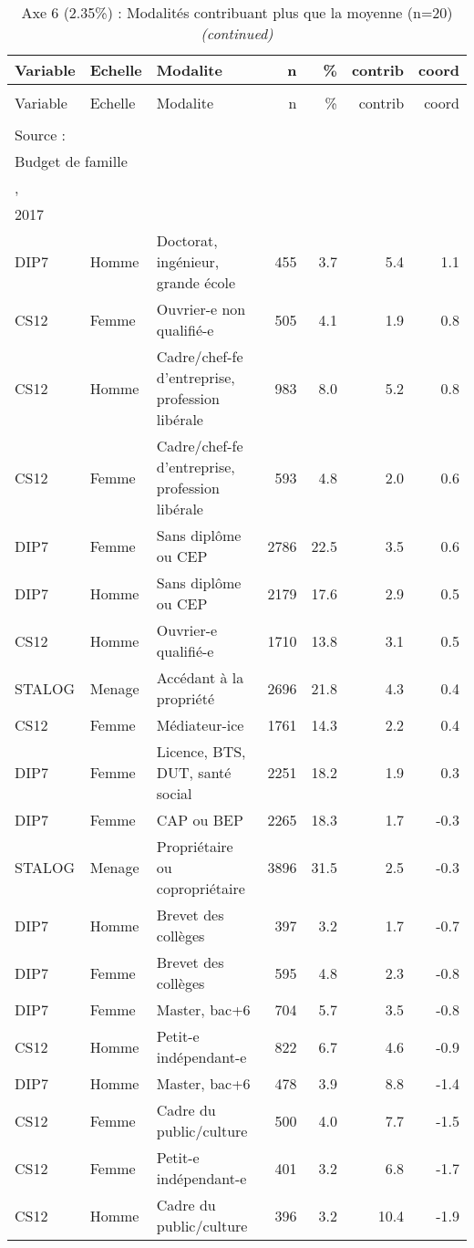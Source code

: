 \documentclass[
  12pt,
]{book}
\begin{document}
\begin{longtable}[t]{lllrrrr}
\caption{Axe 6 (2.35\%) : Modalités contribuant plus que la moyenne  (n=20)}\\
\toprule
Variable & Echelle & Modalite & n & \% & contrib & coord\\
\midrule
\endfirsthead
\caption[]{Axe 6 (2.35\%) : Modalités contribuant plus que la moyenne  (n=20) \textit{(continued)}}\\
\toprule
Variable & Echelle & Modalite & n & \% & contrib & coord\\
\midrule
\endhead

\endfoot
\bottomrule
\multicolumn{7}{l}{\rule{0pt}{1em}\textit{Note: }}\\
\multicolumn{7}{l}{\rule{0pt}{1em}Source :}\\
\multicolumn{7}{l}{\rule{0pt}{1em}Budget de famille}\\
\multicolumn{7}{l}{\rule{0pt}{1em}, }\\
\multicolumn{7}{l}{\rule{0pt}{1em}2017}\\
\endlastfoot
DIP7 & Homme & Doctorat, ingénieur, grande école & 455 & 3.7 & 5.4 & 1.1\\
CS12 & Femme & Ouvrier-e non qualifié-e & 505 & 4.1 & 1.9 & 0.8\\
CS12 & Homme & Cadre/chef-fe d'entreprise, profession libérale & 983 & 8.0 & 5.2 & 0.8\\
CS12 & Femme & Cadre/chef-fe d'entreprise, profession libérale & 593 & 4.8 & 2.0 & 0.6\\
DIP7 & Femme & Sans diplôme ou CEP & 2786 & 22.5 & 3.5 & 0.6\\
\addlinespace
DIP7 & Homme & Sans diplôme ou CEP & 2179 & 17.6 & 2.9 & 0.5\\
CS12 & Homme & Ouvrier-e qualifié-e & 1710 & 13.8 & 3.1 & 0.5\\
STALOG & Menage & Accédant à la propriété & 2696 & 21.8 & 4.3 & 0.4\\
CS12 & Femme & Médiateur-ice & 1761 & 14.3 & 2.2 & 0.4\\
DIP7 & Femme & Licence, BTS, DUT, santé social & 2251 & 18.2 & 1.9 & 0.3\\
\addlinespace
DIP7 & Femme & CAP ou BEP & 2265 & 18.3 & 1.7 & -0.3\\
STALOG & Menage & Propriétaire ou copropriétaire & 3896 & 31.5 & 2.5 & -0.3\\
DIP7 & Homme & Brevet des collèges & 397 & 3.2 & 1.7 & -0.7\\
DIP7 & Femme & Brevet des collèges & 595 & 4.8 & 2.3 & -0.8\\
DIP7 & Femme & Master, bac+6 & 704 & 5.7 & 3.5 & -0.8\\
\addlinespace
CS12 & Homme & Petit-e indépendant-e & 822 & 6.7 & 4.6 & -0.9\\
DIP7 & Homme & Master, bac+6 & 478 & 3.9 & 8.8 & -1.4\\
CS12 & Femme & Cadre du public/culture & 500 & 4.0 & 7.7 & -1.5\\
CS12 & Femme & Petit-e indépendant-e & 401 & 3.2 & 6.8 & -1.7\\
CS12 & Homme & Cadre du public/culture & 396 & 3.2 & 10.4 & -1.9\\*
\end{longtable}
\endgroup{}
\end{document}
